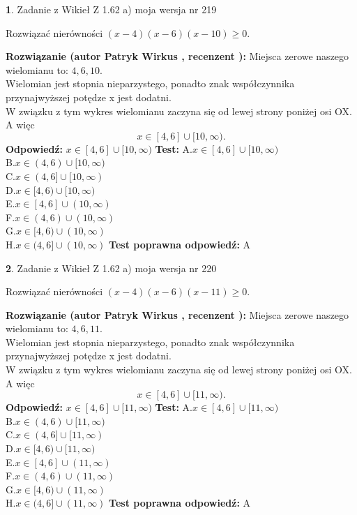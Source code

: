\documentclass[12pt, a4paper]{article}
\theoremstyle{definition} %
\newtheorem{zad}{}
\newcommand{\zadStart}[1]{\begin{zad}#1\newline}
\newcommand{\zadStop}{\end{zad}}
\newcommand{\rozwStart}[2]{\noindent \textbf{Rozwiązanie (autor #1 , recenzent #2): }\newline}
\newcommand{\rozwStop}{\newline}
\newcommand{\odpStart}{\noindent \textbf{Odpowiedź:}\newline}
\newcommand{\odpStop}{\newline}
\newcommand{\testStart}{\noindent \textbf{Test:}\newline}
\newcommand{\testStop}{\newline}
\newcommand{\kluczStart}{\noindent \textbf{Test poprawna odpowiedź:}\newline}
\newcommand{\kluczStop}{\newline}
\begin{document}
\zadStart{Zadanie z Wikieł Z 1.62 a) moja wersja nr 219}

Rozwiązać nierówności $(x-4)(x-6)(x-10)\ge0$.
\zadStop
\rozwStart{Patryk Wirkus}{}
Miejsca zerowe naszego wielomianu to: $4, 6, 10$.\\
Wielomian jest stopnia nieparzystego, ponadto znak współczynnika przy\linebreak najwyższej potędze x jest dodatni.\\ W związku z tym wykres wielomianu zaczyna się od lewej strony poniżej osi OX. A więc $$x \in [4,6] \cup [10,\infty).$$
\rozwStop
\odpStart
$x \in [4,6] \cup [10,\infty)$
\odpStop
\testStart
A.$x \in [4,6] \cup [10,\infty)$\\
B.$x \in (4,6) \cup [10,\infty)$\\
C.$x \in (4,6] \cup [10,\infty)$\\
D.$x \in [4,6) \cup [10,\infty)$\\
E.$x \in [4,6] \cup (10,\infty)$\\
F.$x \in (4,6) \cup (10,\infty)$\\
G.$x \in [4,6) \cup (10,\infty)$\\
H.$x \in (4,6] \cup (10,\infty)$
\testStop
\kluczStart
A
\kluczStop



\zadStart{Zadanie z Wikieł Z 1.62 a) moja wersja nr 220}

Rozwiązać nierówności $(x-4)(x-6)(x-11)\ge0$.
\zadStop
\rozwStart{Patryk Wirkus}{}
Miejsca zerowe naszego wielomianu to: $4, 6, 11$.\\
Wielomian jest stopnia nieparzystego, ponadto znak współczynnika przy\linebreak najwyższej potędze x jest dodatni.\\ W związku z tym wykres wielomianu zaczyna się od lewej strony poniżej osi OX. A więc $$x \in [4,6] \cup [11,\infty).$$
\rozwStop
\odpStart
$x \in [4,6] \cup [11,\infty)$
\odpStop
\testStart
A.$x \in [4,6] \cup [11,\infty)$\\
B.$x \in (4,6) \cup [11,\infty)$\\
C.$x \in (4,6] \cup [11,\infty)$\\
D.$x \in [4,6) \cup [11,\infty)$\\
E.$x \in [4,6] \cup (11,\infty)$\\
F.$x \in (4,6) \cup (11,\infty)$\\
G.$x \in [4,6) \cup (11,\infty)$\\
H.$x \in (4,6] \cup (11,\infty)$
\testStop
\kluczStart
A
\kluczStop
\end{document}
